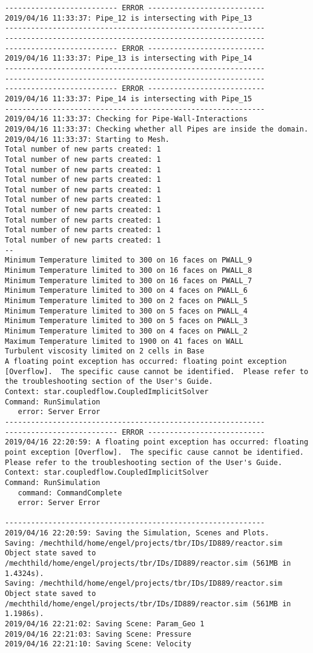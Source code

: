 \documentclass{article}
\begin{document}
{\begin{verbatim}
-------------------------- ERROR ---------------------------
2019/04/16 11:33:37: Pipe_12 is intersecting with Pipe_13
------------------------------------------------------------
------------------------------------------------------------
-------------------------- ERROR ---------------------------
2019/04/16 11:33:37: Pipe_13 is intersecting with Pipe_14
------------------------------------------------------------
------------------------------------------------------------
-------------------------- ERROR ---------------------------
2019/04/16 11:33:37: Pipe_14 is intersecting with Pipe_15
------------------------------------------------------------
2019/04/16 11:33:37: Checking for Pipe-Wall-Interactions
2019/04/16 11:33:37: Checking whether all Pipes are inside the domain.
2019/04/16 11:33:37: Starting to Mesh.
Total number of new parts created: 1
Total number of new parts created: 1
Total number of new parts created: 1
Total number of new parts created: 1
Total number of new parts created: 1
Total number of new parts created: 1
Total number of new parts created: 1
Total number of new parts created: 1
Total number of new parts created: 1
Total number of new parts created: 1
--
Minimum Temperature limited to 300 on 16 faces on PWALL_9
Minimum Temperature limited to 300 on 16 faces on PWALL_8
Minimum Temperature limited to 300 on 16 faces on PWALL_7
Minimum Temperature limited to 300 on 4 faces on PWALL_6
Minimum Temperature limited to 300 on 2 faces on PWALL_5
Minimum Temperature limited to 300 on 5 faces on PWALL_4
Minimum Temperature limited to 300 on 5 faces on PWALL_3
Minimum Temperature limited to 300 on 4 faces on PWALL_2
Maximum Temperature limited to 1900 on 41 faces on WALL
Turbulent viscosity limited on 2 cells in Base
A floating point exception has occurred: floating point exception [Overflow].  The specific cause cannot be identified.  Please refer to the troubleshooting section of the User's Guide.
Context: star.coupledflow.CoupledImplicitSolver
Command: RunSimulation
   error: Server Error
------------------------------------------------------------
-------------------------- ERROR ---------------------------
2019/04/16 22:20:59: A floating point exception has occurred: floating point exception [Overflow].  The specific cause cannot be identified.  Please refer to the troubleshooting section of the User's Guide.
Context: star.coupledflow.CoupledImplicitSolver
Command: RunSimulation
   command: CommandComplete
   error: Server Error

------------------------------------------------------------
2019/04/16 22:20:59: Saving the Simulation, Scenes and Plots.
Saving: /mechthild/home/engel/projects/tbr/IDs/ID889/reactor.sim
Object state saved to /mechthild/home/engel/projects/tbr/IDs/ID889/reactor.sim (561MB in 1.4324s).
Saving: /mechthild/home/engel/projects/tbr/IDs/ID889/reactor.sim
Object state saved to /mechthild/home/engel/projects/tbr/IDs/ID889/reactor.sim (561MB in 1.1986s).
2019/04/16 22:21:02: Saving Scene: Param_Geo 1
2019/04/16 22:21:03: Saving Scene: Pressure
2019/04/16 22:21:10: Saving Scene: Velocity
\end{verbatim}
}
\clearpage
\end{document}
